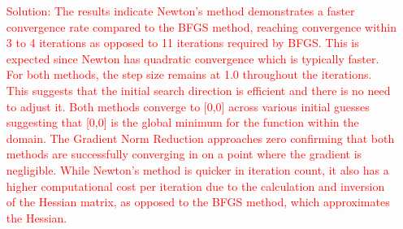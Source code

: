 \documentclass[11pt]{article}
\begin{document}
\begin{enumerate}
\begin{enumerate}
\item[\textcolor{red}{Solution:}] 
\textcolor{red}{
The results indicate Newton's method demonstrates a faster convergence rate compared to the BFGS method, reaching convergence within 3 to 4 iterations as opposed to 11 iterations required by BFGS. This is expected since Newton has quadratic convergence which is typically faster. For both methods, the step size remains at 1.0 throughout the iterations. This suggests that the initial search direction is efficient and there is no need to adjust it. Both methods converge to [0,0] across various initial guesses suggesting that [0,0] is the global minimum for the function within the domain. The Gradient Norm Reduction approaches zero confirming that both methods are successfully converging in on a point where the gradient is negligible. While Newton's method is quicker in iteration count, it also has a higher computational cost per iteration due to the calculation and inversion of the Hessian matrix, as opposed to the BFGS method, which approximates the Hessian.
}









    
  \end{enumerate}

    \end{enumerate}
\end{document}
